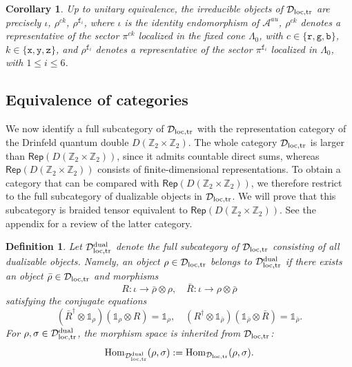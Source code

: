 \documentclass[a4paper,11pt]{article}
\newtheorem{definition}[theorem]{Definition}
\newtheorem{corollary}[theorem]{Corollary}
\theoremstyle{definition}
\theoremstyle{remark}
\theoremstyle{remark}
\newcommand\Rep {\mathsf{Rep}}
\newcommand\Hom {\mathrm{Hom}}
\begin{document}
\begin{corollary}\label{coro:irreducible_objects_complete}
    Up to unitary equivalence, the irreducible objects of
    $\mathcal D_{\rm loc,tr}$ are precisely $\iota$, $\rho^{ck}$, $\rho^{\mathtt f_i}$, where $\iota$ is the identity endomorphism of $\mathcal A^{au}$, $\rho^{ck}$ denotes a representative of the sector $\pi^{ck}$ localized in the fixed cone $\Lambda_0$, with $c\in\{\mathtt r,\mathtt g,\mathtt b\}$, $k\in\{\mathtt x,\mathtt y,\mathtt z\}$, and $\rho^{\mathtt f_i}$ denotes a representative of the sector
    $\pi^{\mathtt f_i}$ localized in $\Lambda_0$, with
    $1\leq i\leq 6$.
\end{corollary}





\subsection{Equivalence of categories}

We now identify a full subcategory of $\mathcal D_{\rm loc,tr}$ with the representation category of the Drinfeld quantum double $D(\mathbb Z_2\times\mathbb Z_2)$. The whole category $\mathcal D_{\rm loc,tr}$ is larger than $\Rep(D(\mathbb Z_2\times\mathbb Z_2))$, since it admits countable direct sums, whereas $\Rep(D(\mathbb Z_2\times\mathbb Z_2))$ consists of finite-dimensional representations. To obtain a category that can be compared with $\Rep(D(\mathbb Z_2\times\mathbb Z_2))$, we therefore restrict to the full subcategory of dualizable objects in $\mathcal D_{\rm loc,tr}$. We will prove that this subcategory is braided tensor equivalent to $\Rep(D(\mathbb Z_2\times\mathbb Z_2))$. See the appendix for a review of the latter category.


\begin{definition}\label{def:dualizable_subcategory}
    Let $\mathcal D_{\rm loc,tr}^{\rm dual}$ denote the full subcategory of $\mathcal D_{\rm loc,tr}$ consisting of all dualizable objects. Namely, an object $\rho\in\mathcal D_{\rm loc,tr}$ belongs to $\mathcal D_{\rm loc,tr}^{\rm dual}$ if there exists an object $\bar\rho\in\mathcal D_{\rm loc,tr}$ and morphisms
    \[
        R:\iota\to \bar\rho\otimes\rho,
        \quad
        \bar R:\iota\to \rho\otimes\bar\rho
    \]
    satisfying the conjugate equations
    \[
        (\bar R^\dagger\otimes\mathds{1}_\rho) (\mathds{1}_\rho\otimes R) = \mathds{1}_\rho, \quad (R^\dagger\otimes\mathds{1}_{\bar\rho}) (\mathds{1}_{\bar\rho}\otimes\bar R) = \mathds{1}_{\bar\rho}.
    \]
    For $\rho,\sigma\in\mathcal D_{\rm loc,tr}^{\rm dual}$, the morphism space is inherited from $\mathcal D_{\rm loc,tr}$:
    \[
        \Hom_{\mathcal D_{\rm loc,tr}^{\rm dual}}(\rho,\sigma)
        :=
        \Hom_{\mathcal D_{\rm loc,tr}}(\rho,\sigma).
    \]
\end{definition}
\end{document}

